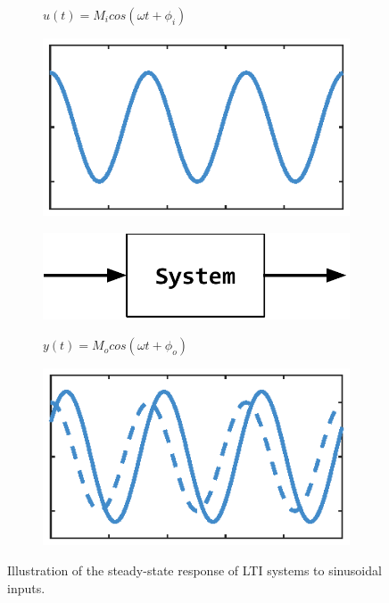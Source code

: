 \documentclass[a4paper,11pt]{book}
\numberwithin{figure}{chapter}
\numberwithin{equation}{chapter}
\numberwithin{table}{chapter}
\theoremstyle{definition}
\begin{document}
\begin{figure}[ht] 
    \centering
    \begin{subfigure}{0.25\textwidth}   
        \centering
        $u(t) = M_i cos(\omega t + \phi_i)$\par\medskip
        \includegraphics[scale=0.55]{chapter2/freq01_1}
    \end{subfigure}
    \begin{subfigure}{0.38\textwidth}   
        \centering
        \includegraphics[scale=0.6]{chapter2/freq01_2}
    \end{subfigure}
    \begin{subfigure}{0.25\textwidth}   
        \centering
        $y(t) = M_o cos(\omega t + \phi_o)$\par\medskip
        \includegraphics[scale=0.55]{chapter2/freq01_3}
    \end{subfigure}
    
    \caption{Illustration of the steady-state response of LTI systems to sinusoidal inputs.}
    \label{fig:freq01}
\end{figure}
\end{document}
